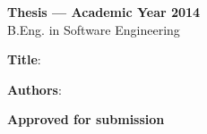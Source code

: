 \thispagestyle{empty}

\begin{flushleft}
\Large{\textbf{Thesis --- Academic Year 2014}} \\
B.Eng. in Software Engineering \kmitl

\vspace{2cm}

\textbf{Title}: \dms

\vspace{1cm}

\textbf{Authors}:

\end{flushleft}

\vfill
\begin{flushright}
\textbf{Approved for submission}
\vspace{1cm}
\vspace{1cm}
 \\
\vspace{1cm}
 \\
\end{flushright}